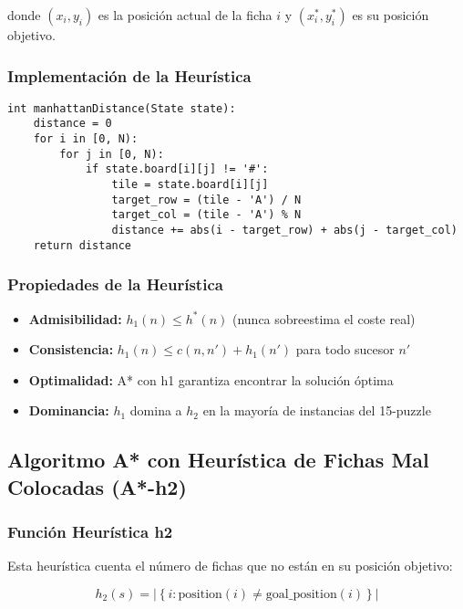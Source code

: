 \documentclass[12pt,a4paper]{article}
\begin{document}
donde $(x_i, y_i)$ es la posición actual de la ficha $i$ y $(x_i^*, y_i^*)$ es su posición objetivo.

\subsubsection{Implementación de la Heurística}

\begin{lstlisting}
int manhattanDistance(State state):
    distance = 0
    for i in [0, N):
        for j in [0, N):
            if state.board[i][j] != '#':
                tile = state.board[i][j]
                target_row = (tile - 'A') / N
                target_col = (tile - 'A') % N
                distance += abs(i - target_row) + abs(j - target_col)
    return distance
\end{lstlisting}

\subsubsection{Propiedades de la Heurística}

\begin{itemize}
    \item \textbf{Admisibilidad:} $h_1(n) \leq h^*(n)$ (nunca sobreestima el coste real)
    \item \textbf{Consistencia:} $h_1(n) \leq c(n, n') + h_1(n')$ para todo sucesor $n'$
    \item \textbf{Optimalidad:} A* con h1 garantiza encontrar la solución óptima
    \item \textbf{Dominancia:} $h_1$ domina a $h_2$ en la mayoría de instancias del 15-puzzle
\end{itemize}

\subsection{Algoritmo A* con Heurística de Fichas Mal Colocadas (A*-h2)}

\subsubsection{Función Heurística h2}

Esta heurística cuenta el número de fichas que no están en su posición objetivo:

\begin{equation}
h_2(s) = \left|\left\{i : \text{position}(i) \neq \text{goal\_position}(i)\right\}\right|
\end{equation}
\end{document}
